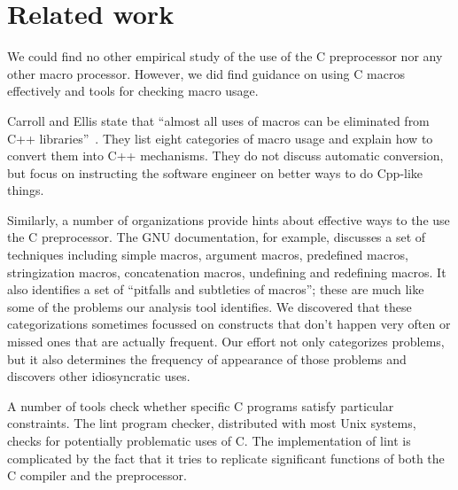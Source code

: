 \documentclass[11pt]{article}
\begin{document}
\section{Related work}
\label{sec:related}

We could find no other empirical study of the use of the C preprocessor nor
any other macro processor.  However, we did find guidance on using C macros
effectively and tools for checking macro usage.

Carroll and Ellis state that ``almost all uses of macros can be eliminated
from C++ libraries''~\cite[p.~146]{Carroll95}.  They list eight categories
of macro usage and explain how to convert them into C++ mechanisms.  They
do not discuss automatic conversion, but focus on instructing the software
engineer on better ways to do Cpp-like things.

Similarly, a number of organizations provide hints about effective ways to
the use the C preprocessor.  The GNU documentation, for example, discusses
a set of techniques including simple macros, argument macros, predefined
macros, stringization macros, concatenation macros, undefining and
redefining macros.  It also identifies a set of ``pitfalls and subtleties
of macros''; these are much like some of the problems our analysis tool
identifies.  We discovered that these categorizations sometimes focussed on
constructs that don't happen very often or missed ones that are actually
frequent.  Our effort not only categorizes problems, but it also determines
the frequency of appearance of those problems and discovers other
idiosyncratic uses.

A number of tools check whether specific C programs satisfy particular
constraints.  The lint program checker, distributed with most Unix systems,
checks for potentially problematic uses of C\@.  The implementation of lint
is complicated by the fact that it tries to replicate significant functions
of both the C compiler and the preprocessor.
\end{document}
